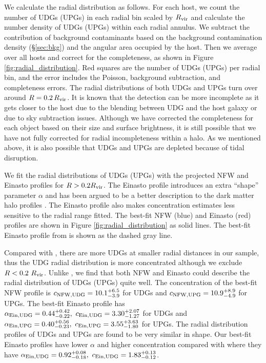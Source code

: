\documentclass[twocolumn,astrosymb,twocolappendix]{aastex631}
\begin{document}
\begin{CJK*}{UTF8}{gbsn}
We calculate the radial distribution as follows. For each host, we count the number of UDGs (UPGs) in each radial bin scaled by $R_{\rm vir}$ and calculate the number density of UDGs (UPGs) within each radial annulus. We subtract the contribution of background contaminants based on the background contamination density (\S \ref{sec:bkg}) and the angular area occupied by the host. Then we average over all hosts and correct for the completeness, as shown in Figure \ref{fig:radial_distribution}. Red squares are the number of UDGs (UPGs) per radial bin, and the error includes the Poisson, background subtraction, and completeness errors. The radial distributions of both UDGs and UPGs turn over around $R=0.2\,R_{\rm vir}$. It is known that the detection can be more incomplete as it gets closer to the host due to the blending between UDG and the host galaxy or due to sky subtraction issues. Although we have corrected the completeness for each object based on their size and surface brightness, it is still possible that we have not fully corrected for radial incompleteness within a halo. As we mentioned above, it is also possible that UDGs and UPGs are depleted because of tidal disruption. 

We fit the radial distributions of UDGs (UPGs) with the projected NFW and Einasto profiles for $R > 0.2 R_{\rm vir}$. The Einasto profile introduces an extra ``shape'' parameter $\alpha$ and has been argued to be a better description to the dark matter halo profiles \citep[e.g.,][]{Navarro2004,Gao2008,Navarro2010,Dutton2014}. The Einasto profile also makes concentration estimates less sensitive to the radial range fitted. The best-fit NFW (blue) and Einasto (red) profiles are shown in Figure \ref{fig:radial_distribution} as solid lines. The best-fit Einasto profile from \citet{vdBurg2016} is shown as the dashed gray line.

Compared with \citet{vdBurg2016}, there are more UDGs at smaller radial distances in our sample, thus the UDG radial distribution is more concentrated although we exclude $R < 0.2\ R_{\rm vir}$. Unlike \citet{vdBurg2016}, we find that both NFW and Einasto could describe the radial distribution of UDGs (UPGs) quite well. The concentration of the best-fit NFW profile is $c_{\rm NFW, UDG} = 10.1^{+6.5}_{-3.9}$ for UDGs and $c_{\rm NFW, UPG} = 10.9^{+8.9}_{-4.9}$ for UPGs. The best-fit Einasto profile has $\alpha_{\rm Ein, UDG} = 0.44^{+0.42}_{-0.22},\ c_{\rm Ein, UDG} = 3.30^{+2.07}_{-1.27}$ for UDGs and $\alpha_{\rm Ein, UPG} = 0.40^{+0.56}_{-0.23},\ c_{\rm Ein, UPG} = 3.55^{+3.63}_{-1.80}$ for UPGs. The radial distribution profiles of UDGs and UPGs are found to be very similar in shape. Our best-fit Einasto profiles have lower $\alpha$ and higher concentration compared with \citet{vdBurg2016} where they have $\alpha_{\rm Ein, UDG} = 0.92^{+0.08}_{-0.18},\ c_{\rm Ein, UDG} = 1.83^{+0.13}_{-0.12}$.


\end{CJK*}
\end{document}
